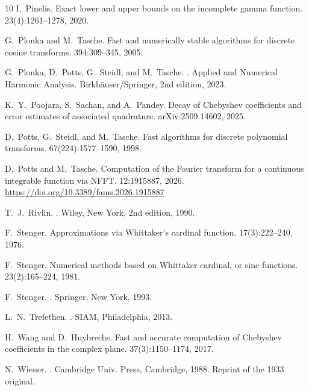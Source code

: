 \documentclass[11pt,a4paper]{scrartcl}
\numberwithin{equation}{section}
\numberwithin{table}{section}
\numberwithin{figure}{section}
\begin{document}
\begin{thebibliography}{10}
I.~Pinelis.
\newblock Exact lower and upper bounds on the incomplete gamma function.
 23(4):1261--1278, 2020.

G.~Plonka and M.~Tasche.
\newblock Fast and numerically stable algorithms for discrete cosine transforms.
 394:309--345, 2005.

G.~Plonka, D.~Potts, G.~Steidl, and M.~Tasche.
.
\newblock Applied and Numerical Harmonic Analysis. Birkh\"auser/Springer, 2nd edition, 2023.

K.~Y.~Poojara, S.~Sachan, and A.~Pandey.
\newblock Decay of Chebyshev coefficients and error estimates of associated quadrature.
\newblock arXiv:2509.14602, 2025.

D.~Potts, G.~Steidl, and M.~Tasche.
\newblock Fast algorithms for discrete polynomial transforms.
 67(224):1577--1590, 1998.

D.~Potts and M.~Tasche.
\newblock Computation of the Fourier transform for a continuous integrable function via NFFT.
 12:1915887, 2026.
\newblock \url{https://doi.org/10.3389/fams.2026.1915887}

T.~J.~Rivlin.
.
\newblock Wiley, New York, 2nd edition, 1990.

F.~Stenger.
\newblock Approximations via Whittaker's cardinal function.
 17(3):222--240, 1976.

F.~Stenger.
\newblock Numerical methods based on Whittaker cardinal, or \textrm{sinc} functions.
 23(2):165--224, 1981.

F.~Stenger.
.
\newblock Springer, New York, 1993.

L.~N.~Trefethen.
.
\newblock SIAM, Philadelphia, 2013.

H.~Wang and D.~Huybrechs.
\newblock Fast and accurate computation of Chebyshev coefficients in the complex plane.
 37(3):1150--1174, 2017.

N.~Wiener.
.
\newblock Cambridge Univ. Press, Cambridge, 1988. Reprint of the 1933 original.

\end{thebibliography}
\end{document}
